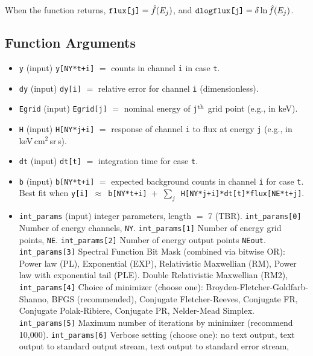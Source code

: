 \documentclass{article}    %
\begin{document}
When the function returns, $\verb|flux[j]| = \hat{f}(E_j)$, and $\verb|dlogflux[j]| = \delta \ln \hat{f}(E_j)$.

\subsection{Function Arguments}
\label{secAnaSpecInvArgs}

\begin{itemize}
\item \verb|y| (input) \verb|y[NY*t+i]| $=$ counts in channel \verb|i| in case \verb|t|.
\item \verb|dy| (input) \verb|dy[i]| $=$ relative error for channel \verb|i| (dimensionless).
\item \verb|Egrid| (input) \verb|Egrid[j]| $=$ nominal energy of \verb|j|$^{\rm th}$ grid point (e.g., in keV).
\item \verb|H| (input) \verb|H[NY*j+i]| $=$ response of channel \verb|i| to flux at energy \verb|j| (e.g., in keV\,cm$^2$\,sr\,s).
\item \verb|dt| (input) \verb|dt[t]| $=$ integration time for case \verb|t|.
\item \verb|b| (input) \verb|b[NY*t+i]| $=$ expected background counts in channel \verb|i| for case \verb|t|. Best fit when \verb|y[i]|~$\approx$~\verb|b[NY*t+i]|~+~$\sum_j$~\verb|H[NY*j+i]*dt[t]*flux[NE*t+j]|.
\item \verb|int_params| (input) integer parameters, length $=$ 7 (TBR).
\subitem \verb|int_params[0]| Number of energy channels, \verb|NY|.
\subitem \verb|int_params[1]| Number of energy grid points, \verb|NE|.
\subitem \verb|int_params[2]| Number of energy output points \verb|NEout|.
\subitem \verb|int_params[3]| Spectral Function Bit Mask (combined via bitwise OR):
\subsubitem[1] Power law (PL),
\subsubitem[2] Exponential (EXP),
\subsubitem[4] Relativistic Maxwellian (RM),
\subsubitem[8] Power law with exponential tail (PLE).
\subsubitem[16] Double Relativistic Maxwellian (RM2),
\subitem \verb|int_params[4]| Choice of minimizer (choose one):
\subsubitem[0] Broyden-Fletcher-Goldfarb-Shanno, BFGS (recommended),
\subsubitem[1] Conjugate Fletcher-Reeves, Conjugate FR,
\subsubitem[2] Conjugate Polak-Ribiere, Conjugate PR,
\subsubitem[3] Nelder-Mead Simplex.
\subitem \verb|int_params[5]| Maximum number of iterations by minimizer (recommend 10,000).
\subitem \verb|int_params[6]| Verbose setting (choose one):
\subsubitem[0] no text output,
\subsubitem[1] text output to standard output stream,
\subsubitem[2] text output to standard error stream,

\end{itemize}
\end{document}
